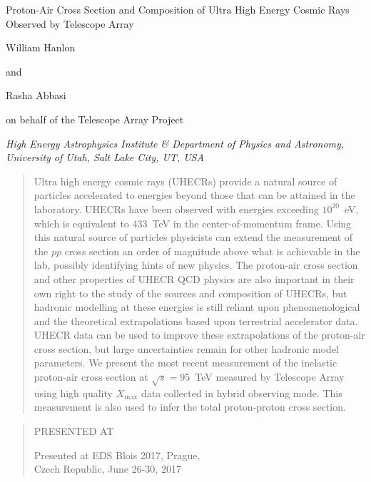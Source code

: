 \documentclass[12pt]{article}
\newcommand\pubnumber{preprint No (if applicable)}
\newcommand\pubdate{\today}
\newcommand{\xm}{$X_{\mathrm{max}}$}
\def\Title#1{\begin{center} {\Large #1 } \end{center}}
\def\Author#1{\begin{center}{ \sc #1} \end{center}}
\def\Address#1{\begin{center}{ \it #1} \end{center}}
\def\andauth{\begin{center}{and} \end{center}}
\newcommand\pubblock{\rightline{\begin{tabular}{l} \pubnumber\\
         \pubdate  \end{tabular}}}
\newenvironment{Abstract}{\begin{quotation}  }{\end{quotation}}
\newenvironment{Presented}{\begin{quotation} \begin{center} 
             PRESENTED AT\end{center}\bigskip 
      \begin{center}\begin{large}}{\end{large}\end{center} \end{quotation}}
\begin{document}
\begin{titlepage}

\vfill
\Title{Proton-Air Cross Section and Composition of Ultra High Energy
  Cosmic Rays Observed by Telescope Array}
\vfill
\Author{William Hanlon \andauth Rasha Abbasi \\
  \medskip\begin{center} on behalf of the Telescope Array Project\end{center}}
\Address{High Energy Astrophysics Institute \& Department of Physics
  and Astronomy, University of Utah, Salt Lake City, UT, USA}
\vfill
\begin{Abstract}
Ultra high energy cosmic rays (UHECRs) provide a natural source of
particles accelerated to energies beyond those that can be attained in
the laboratory. UHECRs have been observed with energies exceeding
$10^{20}$~eV, which is equivalent to 433~TeV in the center-of-momentum
frame. Using this natural source of particles physicists can extend
the measurement of the $pp$ cross section an order of magnitude above
what is achievable in the lab, possibly identifying hints of new
physics. The proton-air cross section and other properties of UHECR
QCD physics are also important in their own right to the study of the
sources and composition of UHECRs, but hadronic modelling at these
energies is still reliant upon phenomenological and the theoretical
extrapolations based upon terrestrial accelerator data. UHECR data can
be used to improve these extrapolations of the proton-air cross
section, but large uncertainties remain for other hadronic model
parameters. We present the most recent measurement of the inelastic
proton-air cross section at $\sqrt{s} = 95$~TeV measured by Telescope
Array using high quality \xm{} data collected in hybrid observing
mode. This measurement is also used to infer the total proton-proton
cross section.
\end{Abstract}
\vfill
\begin{Presented}
Presented at EDS Blois 2017, Prague, \\ Czech Republic, June 26-30, 2017
\end{Presented}
\vfill
\end{titlepage}
\def\thefootnote{\fnsymbol{footnote}}
\setcounter{footnote}{0}
%

\end{document}
